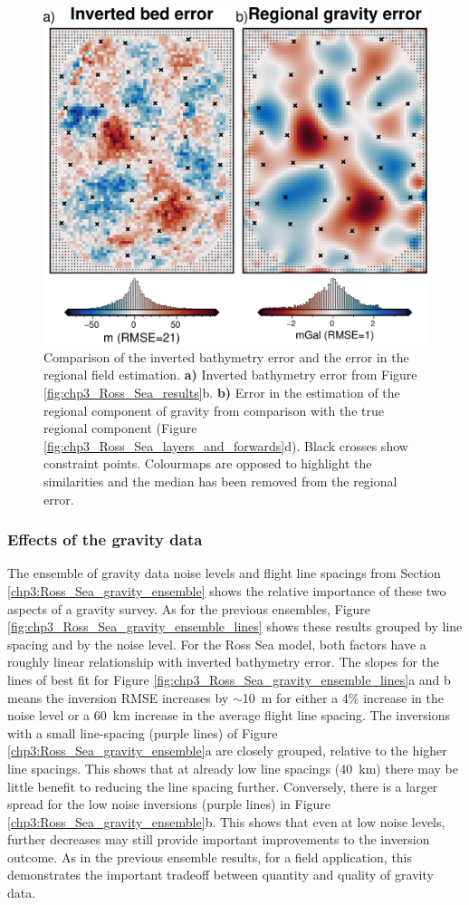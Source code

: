 \begin{figure}[!ht]
    \centering
    \includegraphics[width=.7\textwidth]{figures/chp3/chp3_Ross_Sea_regional_bed_error.png}
    \caption[Ross Sea inversion error and regional error]{Comparison of the inverted bathymetry error and the error in the regional field estimation. \textbf{a)} Inverted bathymetry error from Figure \ref{fig:chp3_Ross_Sea_results}b. \textbf{b)} Error in the estimation of the regional component of gravity from comparison with the true regional component (Figure \ref{fig:chp3_Ross_Sea_layers_and_forwards}d). Black crosses show constraint points. Colourmaps are opposed to highlight the similarities and the median has been removed from the regional error.}
    \label{fig:chp3_Ross_Sea_regional_bed_error}
\end{figure}

\subsubsection{Effects of the gravity data} \label{chp3_effect_of_gravity_noise}

The ensemble of gravity data noise levels and flight line spacings from Section \ref{chp3:Ross_Sea_gravity_ensemble} shows the relative importance of these two aspects of a gravity survey. As for the previous ensembles, Figure \ref{fig:chp3_Ross_Sea_gravity_ensemble_lines} shows these results grouped by line spacing and by the noise level. For the Ross Sea model, both factors have a roughly linear relationship with inverted bathymetry error. The slopes for the lines of best fit for Figure \ref{fig:chp3_Ross_Sea_gravity_ensemble_lines}a and b means the inversion RMSE increases by $\sim$10~m for either a 4\% increase in the noise level or a 60~km increase in the average flight line spacing. The inversions with a small line-spacing (purple lines) of Figure \ref{chp3:Ross_Sea_gravity_ensemble}a are closely grouped, relative to the higher line spacings. This shows that at already low line spacings (40~km) there may be little benefit to reducing the line spacing further. Conversely, there is a larger spread for the low noise inversions (purple lines) in Figure \ref{chp3:Ross_Sea_gravity_ensemble}b. This shows that even at low noise levels, further decreases may still provide important improvements to the inversion outcome. As in the previous ensemble results, for a field application, this demonstrates the important tradeoff between quantity and quality of gravity data. \\

